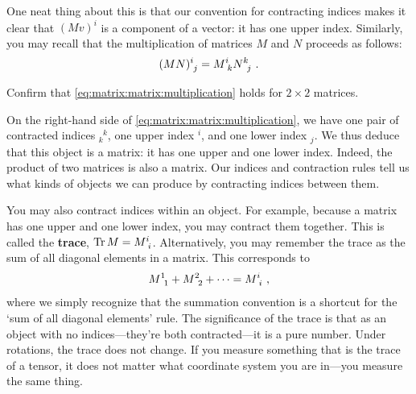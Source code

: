 One neat thing about this is that our convention for contracting indices makes it clear that $(Mv)^i$ is a component of a vector: it has one upper index. Similarly, you may recall that the multiplication of matrices $M$ and $N$ proceeds as follows:
\begin{align}
 (MN)\aij{i}{j} = M\aij{i}{k}N\aij{k}{j} \ .
 \label{eq:matrix:matrix:multiplication}    
\end{align}
\begin{exercise}
Confirm that \eqref{eq:matrix:matrix:multiplication} holds for $2\times 2$ matrices.
\end{exercise}
On the right-hand side of \eqref{eq:matrix:matrix:multiplication}, we have one pair of contracted indices $_k^{\phantom{k}k}$, one upper index $^i$, and one lower index $_j$. We thus deduce that this object is a matrix: it has one upper and one lower index. Indeed, the product of two matrices is also a matrix. Our indices and contraction rules tell us what kinds of objects we can produce by contracting indices between them. 

\begin{example}
You may also contract indices within an object. For example, because a matrix has one upper and one lower index, you may contract them together. This is called the \textbf{trace}, $\Tr M = M\aij{i}{i}$. Alternatively, you may remember the trace as the sum of all diagonal elements in a matrix. This corresponds to 
\begin{align}
    M\aij{1}{1} + M\aij{2}{2} + \cdots = M\aij{i}{i} \ ,
\end{align}
where we simply recognize that the summation convention is a shortcut for the `sum of all diagonal elements' rule. The significance of the trace is that as an object with no indices---they're both contracted---it is a pure number. Under rotations, the trace does not change. If you measure something that is the trace of a tensor, it does not matter what coordinate system you are in---you measure the same thing.
\end{example}
